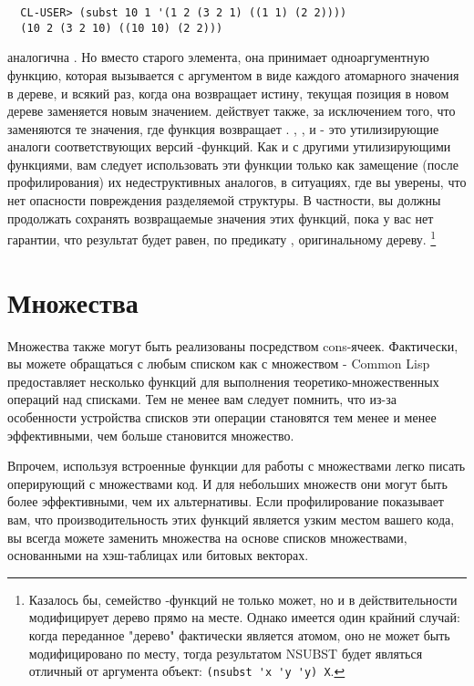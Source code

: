 \begin{verbatim}
  CL-USER> (subst 10 1 '(1 2 (3 2 1) ((1 1) (2 2))))
  (10 2 (3 2 10) ((10 10) (2 2)))
\end{verbatim}

 аналогична . Но вместо старого элемента, она принимает
одноаргументную функцию, которая вызывается с аргументом в виде каждого атомарного
значения в дереве, и всякий раз, когда она возвращает истину, текущая позиция в новом
дереве заменяется новым значением.  действует также, за исключением
того, что заменяются те значения, где функция возвращает . ,
, и  - это утилизирующие аналоги соответствующих
версий -функций. Как и с другими утилизирующими функциями, вам следует
использовать эти функции только как замещение (после профилирования) их недеструктивных
аналогов, в ситуациях, где вы уверены, что нет опасности повреждения разделяемой
структуры. В частности, вы должны продолжать сохранять возвращаемые значения этих функций,
пока у вас нет гарантии, что результат будет равен, по предикату , оригинальному
дереву. \footnote{Казалось бы, семейство -функций не только может, но и в
  действительности модифицирует дерево прямо на месте. Однако имеется один крайний случай:
  когда переданное "дерево" фактически является атомом, оно не может быть модифицировано
  по месту, тогда результатом NSUBST будет являться отличный от аргумента объект:
  \lstinline!(nsubst 'x 'y 'y) X!.}

\section{Множества}

Множества также могут быть реализованы посредством cons-ячеек. Фактически, вы можете
обращаться с любым списком как с множеством - Common Lisp предоставляет несколько функций
для выполнения теоретико-множественных операций над списками. Тем не менее вам следует
помнить, что из-за особенности устройства списков эти операции становятся тем менее и
менее эффективными, чем больше становится множество.

Впрочем, используя встроенные функции для работы с множествами легко писать оперирующий с
множествами код. И для небольших множеств они могут быть более эффективными, чем их
альтернативы. Если профилирование показывает вам, что производительность этих функций
является узким местом вашего кода, вы всегда можете заменить множества на основе списков
множествами, основанными на хэш-таблицах или битовых векторах.

